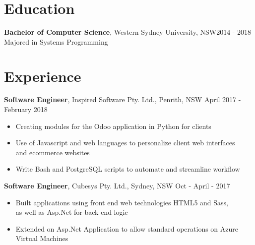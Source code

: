 \documentclass[margin]{res}
\begin{document}

\address{{\bf Present Address} \\ 10 Joseph Street \\ Kingswood, NSW 2747  \\
        0414329597 }
\address{{\bf Email Address} \\ ben.hili1994@gmail.com }


\begin{resume}

\section{Education}
	{\bf Bachelor of Computer Science}, Western Sydney University, NSW\hfill 2014 - 2018\\ 
	Majored in Systems Programming

\section{Experience}
{\bf Software Engineer}, 
	Inspired Software Pty. Ltd., Penrith, NSW \hfill April 2017 - February 2018
\begin{itemize} \itemsep 0pt  %
\item Creating modules for the Odoo application in Python for clients

\item Use of Javascript and web languages to personalize client web interfaces \\
            and ecommerce websites

\item Write Bash and PostgreSQL scripts to automate and streamline workflow
\end{itemize}

 {\bf Software Engineer}, 
	Cubesys Pty. Ltd., Sydney, NSW \hfill Oct - April - 2017
 \begin{itemize} \itemsep 0pt  %
 \item Built applications using front end web technologies HTML5 and Sass, \\
       as well as Asp.Net for back end logic

 \item Extended on Asp.Net Application to allow standard operations on Azure \\
       Virtual Machines


\end{itemize}
\end{resume}
\end{document}
